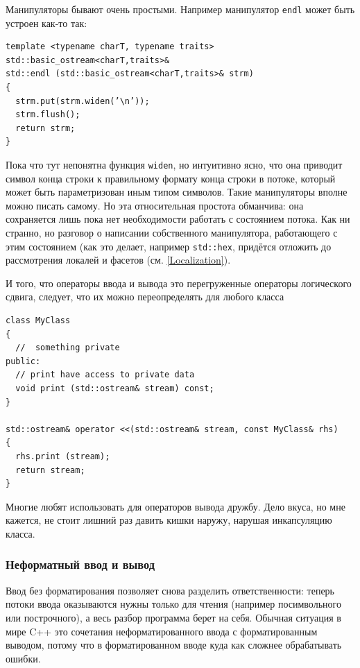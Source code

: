 \documentclass[a4paper,12pt,oneside]{article}
\begin{document}
Манипуляторы бывают очень простыми. Например манипулятор \lstinline!endl! может быть устроен как-то так:

\begin{lstlisting}
template <typename charT, typename traits>
std::basic_ostream<charT,traits>&
std::endl (std::basic_ostream<charT,traits>& strm)
{
  strm.put(strm.widen(’\n’));
  strm.flush();
  return strm;
}
\end{lstlisting}

Пока что тут непонятна функция \lstinline!widen!, но интуитивно ясно, что она приводит символ конца строки к правильному формату конца строки в потоке, который может быть параметризован иным типом символов. Такие манипуляторы вполне можно писать самому. Но эта относительная простота обманчива: она сохраняется лишь пока нет необходимости работать с состоянием потока. Как ни странно, но разговор о написании собственного манипулятора, работающего с этим состоянием (как это делает, например \lstinline!std::hex!, придётся отложить до рассмотрения локалей и фасетов (см. \ref{Localization}).

И того, что операторы ввода и вывода это перегруженные операторы логического сдвига, следует, что их можно переопределять для любого класса

\begin{lstlisting}
class MyClass
{
  //  something private
public:
  // print have access to private data
  void print (std::ostream& stream) const; 
}

std::ostream& operator <<(std::ostream& stream, const MyClass& rhs) 
{
  rhs.print (stream);
  return stream;
}
\end{lstlisting}

Многие любят использовать для операторов вывода дружбу. Дело вкуса, но мне кажется, не стоит лишний раз давить кишки наружу, нарушая инкапсуляцию класса.

\subsubsection{Неформатный ввод и вывод}

Ввод без форматирования позволяет снова разделить ответственности: теперь потоки ввода оказываются нужны только для чтения (например посимвольного или построчного), а весь разбор программа берет на себя. Обычная ситуация в мире C++ это сочетания неформатированного ввода с форматированным выводом, потому что в форматированном вводе куда как сложнее обрабатывать ошибки.
\end{document}
